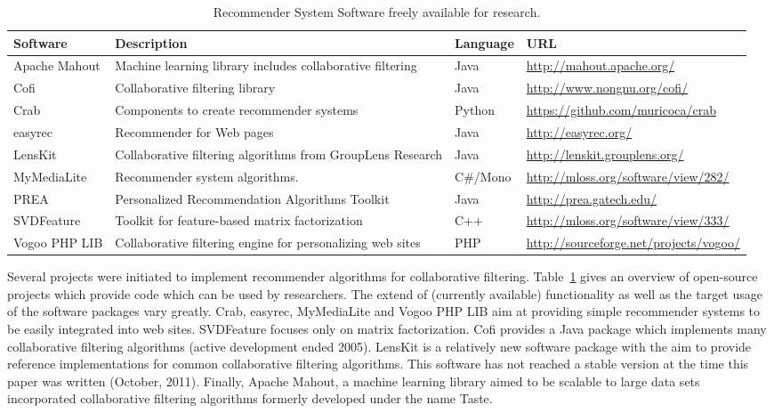 \documentclass[nojss]{jss}
\begin{document}
\begin{table}
\begin{tabular}{|p{1.9cm}|p{3cm}|l|l|}
\hline
{\bf Software} & {\bf Description} & {\bf Language} & {\bf URL} \\
\hline
\hline
Apache Mahout & Machine learning library includes collaborative filtering &Java& \small\url{http://mahout.apache.org/}\\
\hline
Cofi & Collaborative filtering library & Java & \small\url{http://www.nongnu.org/cofi/}\\
\hline
Crab & Components to create recommender systems & Python & \small\url{https://github.com/muricoca/crab}\\
\hline
easyrec & Recommender for Web pages & Java & \small\url{http://easyrec.org/}\\
\hline
LensKit & Collaborative filtering algorithms from GroupLens Research & Java & \small\url{http://lenskit.grouplens.org/}\\
\hline
MyMediaLite & Recommender system algorithms. & C\#/Mono & \small\url{http://mloss.org/software/view/282/}\\
\hline
PREA & Personalized Recommendation Algorithms Toolkit & Java &  \url{http://prea.gatech.edu/}\\
\hline
SVDFeature & Toolkit for feature-based matrix factorization& C++ & \small\url{http://mloss.org/software/view/333/}\\
\hline
Vogoo PHP LIB & Collaborative filtering engine for personalizing web sites & PHP & \small\url{http://sourceforge.net/projects/vogoo/} \\

\hline
\end{tabular}
\caption{Recommender System Software freely available for research.}
\label{tab:software}
\end{table}

Several projects were initiated
to implement recommender algorithms for collaborative filtering.
Table~\ref{tab:software} gives an overview of open-source projects
which provide code which can be used by researchers.
The extend of (currently available) functionality as well as the target
usage of the software packages vary greatly.
Crab, easyrec, MyMediaLite and Vogoo PHP LIB aim at providing simple
recommender systems to be easily integrated into web sites.
SVDFeature focuses only on matrix factorization.
Cofi provides a Java package which implements many
collaborative filtering algorithms (active development ended 2005).
LensKit is a relatively new software package with the aim
to provide reference implementations for common collaborative
filtering algorithms. This software has not reached a stable version
at the time this paper was written (October, 2011).
Finally, Apache Mahout, a machine learning
library aimed to be scalable to large data sets incorporated
collaborative filtering algorithms formerly developed under the
name Taste.
\end{document}
